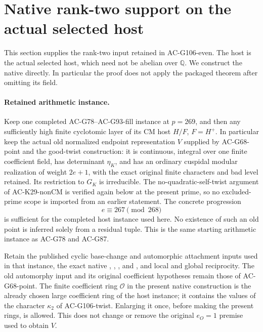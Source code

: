 \section{Native rank-two support on the actual selected host}
\label{sec:cubic-rank-two-native-support}

This section supplies the rank-two input retained in AC-G106-even.
The host is the actual selected host, which need not be abelian
over \(\mathbb Q\). We construct the native 
directly. In particular the proof does not apply the packaged
 theorem after omitting its  field.

\paragraph{Retained arithmetic instance.}
Keep one completed AC-G78--AC-G93-fill instance at \(p=269\),
and then any sufficiently high finite cyclotomic layer of its
CM host \(H/F\), \(F=H^+\). In particular keep the actual
old normalized endpoint representation \(V\) supplied by
AC-G68-point and the good-twist construction: it is continuous,
integral over one finite coefficient field, has determinant
\(\eta_K\), and has an ordinary cuspidal modular realization
of weight \(2e+1\), with the exact original finite characters
and bad level retained. Its restriction to \(G_K\) is
irreducible. The no-quadratic-self-twist argument of
AC-K29-nonCM is verified again below at the present prime,
so no excluded-prime scope is imported from an earlier statement.
The concrete progression
\[
                         e\equiv267\pmod {268}
\tag{G106N.1}
\]
is sufficient for the completed host instance used here.
No existence of such an old point is inferred solely from a
residual tuple. This is the same starting arithmetic instance
as AC-G78 and AC-G87.

Retain the published cyclic base-change and automorphic
attachment inputs used in that instance, the exact native
, , ,
and , and local and global reciprocity. The old
automorphy input and its original coefficient hypotheses remain
those of AC-G68-point. The finite coefficient ring
\(\mathcal O\) in the present native construction is the
already chosen large coefficient ring of the host instance;
it contains the values of the character \(\kappa_2\) of
AC-G106-twist. Enlarging it once, before making the present
rings, is allowed. This does not change or remove the original
\(e_O=1\) premise used to obtain \(V\).

